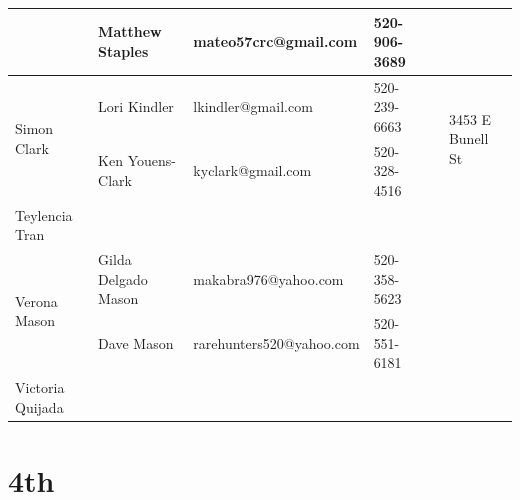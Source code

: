\documentclass[landscape]{article}\usepackage[]{graphicx}\usepackage[]{color}
\begin{document}
\begin{longtable}{|p{100pt}|p{100pt}|p{140pt}|p{60pt}|p{64pt}|p{120pt}|}
 & Matthew Staples & mateo57crc@gmail.com & 520-906-3689 &  & \\
\hline
\multirow{2}{100pt}{Simon Clark} & Lori Kindler & lkindler@gmail.com & 520-239-6663 &  & \multirow{2}{120pt}{3453 E Bunell St} \\
 & Ken Youens-Clark & kyclark@gmail.com & 520-328-4516 &  & \\
\hline
\multirow{2}{100pt}{Teylencia Tran} &  &  &  &  & \multirow{2}{120pt}{} \\
 &  &  &  &  & \\
\hline
\multirow{2}{100pt}{Verona Mason} & Gilda Delgado Mason & makabra976@yahoo.com & 520-358-5623 &  & \multirow{2}{120pt}{} \\
 & Dave Mason & rarehunters520@yahoo.com & 520-551-6181 &  & \\
\hline
\multirow{2}{100pt}{Victoria Quijada} &  &  &  &  & \multirow{2}{120pt}{} \\
 &  &  &  &  & \\
\hline
\end{longtable}
\newpage
\section{4th}
\end{document}

